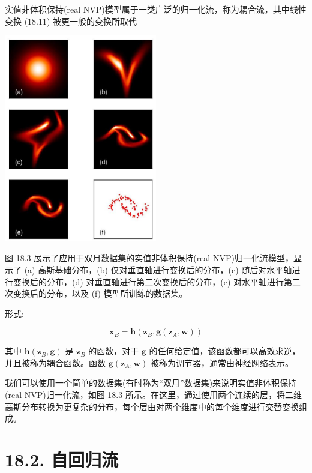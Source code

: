 \documentclass[10pt]{article}
\begin{document}
实值非体积保持(real NVP)模型属于一类广泛的归一化流，称为耦合流，其中线性变换 (18.11) 被更一般的变换所取代

\begin{center}
\includegraphics[max width=0.5\textwidth]{images/0194e279-9b28-703a-88f4-c3ac21e2010d_571_892_349_654_889_0.jpg}
\end{center}
\hspace*{3em} 

图 18.3 展示了应用于双月数据集的实值非体积保持(real NVP)归一化流模型，显示了 (a) 高斯基础分布，(b) 仅对垂直轴进行变换后的分布，(c) 随后对水平轴进行变换后的分布，(d) 对垂直轴进行第二次变换后的分布，(e) 对水平轴进行第二次变换后的分布，以及 (f) 模型所训练的数据集。

形式:

\[
{\mathbf{x}}_{B} = \mathbf{h}\left( {{\mathbf{z}}_{B},\mathbf{g}\left( {{\mathbf{z}}_{A},\mathbf{w}}\right) }\right)  \tag{18.15}
\]

其中 \(\mathbf{h}\left( {{\mathbf{z}}_{B},\mathbf{g}}\right)\) 是 \({\mathbf{z}}_{B}\) 的函数，对于 \(\mathbf{g}\) 的任何给定值，该函数都可以高效求逆，并且被称为耦合函数。函数 \(\mathbf{g}\left( {{\mathbf{z}}_{A},\mathbf{w}}\right)\) 被称为调节器，通常由神经网络表示。

我们可以使用一个简单的数据集(有时称为“双月”数据集)来说明实值非体积保持(real NVP)归一化流，如图 18.3 所示。在这里，通过使用两个连续的层，将二维高斯分布转换为更复杂的分布，每个层由对两个维度中的每个维度进行交替变换组成。

\section*{18.2. 自回归流}
\end{document}
